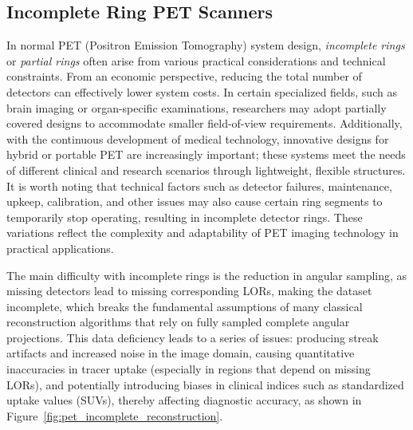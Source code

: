 \documentclass[
reprint,
superscriptaddress,
nofootinbib,
amsmath,amssymb,
aps,
prd,
]{revtex4-2}
\begin{document}
\subsection{Incomplete Ring PET Scanners}

In normal PET (Positron Emission Tomography) system design, \emph{incomplete rings} or \emph{partial rings} often arise from various practical considerations and technical constraints. From an economic perspective, reducing the total number of detectors can effectively lower system costs. In certain specialized fields, such as brain imaging or organ-specific examinations, researchers may adopt partially covered designs to accommodate smaller field-of-view requirements. Additionally, with the continuous development of medical technology, innovative designs for hybrid or portable PET are increasingly important; these systems meet the needs of different clinical and research scenarios through lightweight, flexible structures. It is worth noting that technical factors such as detector failures, maintenance, upkeep, calibration, and other issues may also cause certain ring segments to temporarily stop operating, resulting in incomplete detector rings. These variations reflect the complexity and adaptability of PET imaging technology in practical applications.


The main difficulty with incomplete rings is the reduction in angular sampling, as missing detectors lead to missing corresponding LORs, making the dataset incomplete, which breaks the fundamental assumptions of many classical reconstruction algorithms that rely on fully sampled complete angular projections. This data deficiency leads to a series of issues: producing streak artifacts and increased noise in the image domain, causing quantitative inaccuracies in tracer uptake (especially in regions that depend on missing LORs), and potentially introducing biases in clinical indices such as standardized uptake values (SUVs), thereby affecting diagnostic accuracy, as shown in Figure~\ref{fig:pet_incomplete_reconstruction}.
\end{document}
